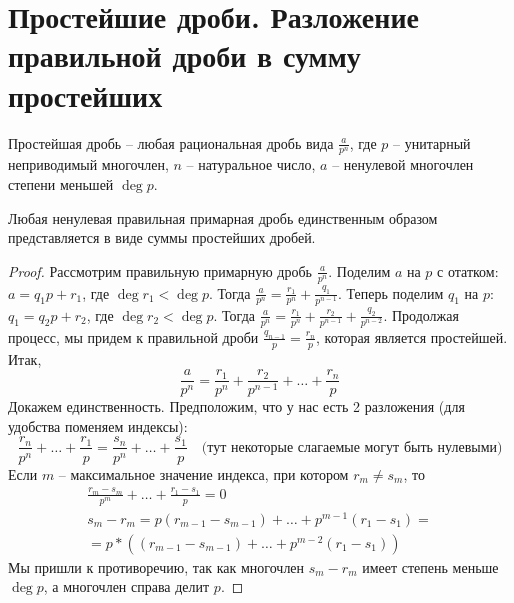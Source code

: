 \section{Простейшие дроби. Разложение правильной дроби в сумму простейших}
\begin{conj}
    Простейшая дробь -- любая рациональная дробь вида $\frac{a}{p^n}$, где $p$ -- унитарный неприводимый многочлен, 
    $n$ -- натуральное число, $a$ -- ненулевой многочлен степени меньшей $\deg p$. 
\end{conj}

\begin{theorem-non}
    Любая ненулевая правильная примарная дробь единственным образом представляется в виде суммы простейших дробей.
\end{theorem-non}

\begin{proof}
    Рассмотрим правильную примарную дробь $\frac{a}{p^n}$. 
    Поделим $a$ на $p$ с отатком: $a = q_1p + r_1$, где $\deg r_1 < \deg p$. 
    Тогда $\frac{a}{p^n} = \frac{r_1}{p^n} + \frac{q_1}{p^{n - 1}}$. 
    Теперь поделим $q_1$ на $p$: $q_1 = q_2p + r_2$, где $\deg r_2 < \deg p$.
    Тогда $\frac{a}{p^n} = \frac{r_1}{p^n} + \frac{r_2}{p^{n - 1}} + \frac{q_2}{p^{n - 2}}$.
    Продолжая процесс, мы придем к правильной дроби $\frac{q_{n - 1}}{p} = \frac{r_n}{p}$, которая является простейшей. 
    Итак, \[ \frac{a}{p^n} = \frac{r_1}{p^n} + \frac{r_2}{p^{n - 1}} + \dots + \frac{r_n}{p} \]
    Докажем единственность. 
    Предположим, что у нас есть 2 разложения (для удобства поменяем индексы):
    \[ \frac{r_n}{p^n} + \dots + \frac{r_1}{p} = \frac{s_n}{p^n} + \dots + \frac{s_1}{p} \quad \text{(тут некоторые слагаемые могут быть нулевыми)} \]
    Если $m$ -- максимальное значение индекса, при котором $r_m \neq s_m$, то 
    \begin{gather*}
        \frac{r_m - s_m}{p^m} + \dots + \frac{r_1 - s_1}{p} = 0 \\
        s_m - r_m = p(r_{m - 1} - s_{m - 1}) + \dots + p^{m - 1}(r_1 - s_1) = \\
        = p * ((r_{m - 1} - s_{m - 1}) + \dots + p^{m - 2}(r_1 - s_1))
    \end{gather*}
    Мы пришли к противоречию, так как многочлен $s_m - r_m$ имеет степень меньше $\deg p$, а многочлен справа делит $p$.
\end{proof}

\vspace{7mm}

